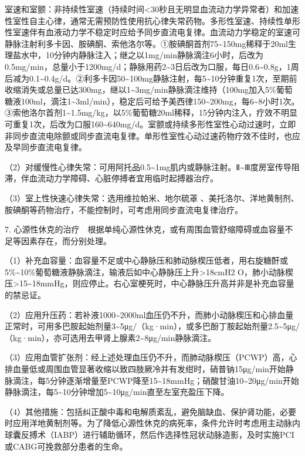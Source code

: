 室速和室颤：非持续性室速（持续时间\textless{}30秒且无明显血流动力学异常者）和加速性室性自主心律，通常无需预防性使用抗心律失常药物。多形性室速、持续性单形性室速伴有血液动力学不稳定时应给予同步直流电复律。血流动力学稳定的室速可静脉注射利多卡因、胺碘酮、索他洛尔等。①胺碘酮首剂75\textasciitilde{}150mg稀释于20ml生理盐水中，10分钟内静脉注入；继之以1mg/min静脉滴注6小时，后改为0.5mg/min，总量小于1200mg/d；静脉用药2\textasciitilde{}3日后改为口服，每日0.6\textasciitilde{}0.8g，1周后减为0.1\textasciitilde{}0.4g/d。②利多卡因50\textasciitilde{}100mg静脉注射，每5\textasciitilde{}10分钟重复1次，至期前收缩消失或总量已达300mg，继以1\textasciitilde{}3mg/min静脉滴注维持（100mg加入5\%葡萄糖液100ml，滴注1\textasciitilde{}3ml/min），稳定后可给予美西律150\textasciitilde{}200mg，每6\textasciitilde{}8小时1次。③索他洛尔首剂1\textasciitilde{}1.5mg/kg，以5\%葡萄糖20ml稀释，15分钟内注入，疗效不明显可重复1次，后改为口服160\textasciitilde{}640mg/d。室颤或持续多形性室性心动过速时，立即非同步直流电除颤或同步直流电复律。单形性室性心动过速药物疗效不佳时，也应及早同步直流电复律。

（2）对缓慢性心律失常：可用阿托品0.5\textasciitilde{}1mg肌内或静脉注射。Ⅱ\textasciitilde{}Ⅲ度房室传导阻滞，伴血流动力学障碍、心脏停搏者宜用临时起搏器治疗。

（3）室上性快速心律失常：选用维拉帕米、地尔硫䓬
、美托洛尔、洋地黄制剂、胺碘酮等药物治疗，不能控制时，可考虑用同步直流电复律治疗。

7.
心源性休克的治疗　根据单纯心源性休克，或有周围血管舒缩障碍或血容量不足等因素存在，而分别处理。

（1）补充血容量：血容量不足或中心静脉压和肺动脉楔压低者，用右旋糖酐或5\%\textasciitilde{}10\%葡萄糖液静脉滴注，输液后如中心静脉压上升\textgreater{}18cmH{2}
O，肺小动脉楔压\textgreater{}15\textasciitilde{}18mmHg，则应停止。右心室梗死时，中心静脉压升高并非是补充血容量的禁忌证。

（2）应用升压药：若补液1000\textasciitilde{}2000ml血压仍不升，而肺小动脉楔压和心排血量正常时，可用多巴胺起始剂量3\textasciitilde{}5μg/（kg·min），或多巴酚丁胺起始剂量2.5\textasciitilde{}5μg/（kg·min），亦可选用去甲肾上腺素2\textasciitilde{}8μg/min静脉滴注。

（3）应用血管扩张剂：经上述处理血压仍不升，而肺动脉楔压（PCWP）高，心排血量低或周围血管显著收缩以致四肢厥冷并有发绀时，硝普钠15μg/min开始静脉滴注，每5分钟逐渐增量至PCWP降至15\textasciitilde{}18mmHg；硝酸甘油10\textasciitilde{}20μg/min开始静脉滴注，每5\textasciitilde{}10分钟增加5\textasciitilde{}10μg/min直至左室充盈压下降。

（4）其他措施：包括纠正酸中毒和电解质紊乱，避免脑缺血、保护肾功能，必要时应用洋地黄制剂等。为了降低心源性休克的病死率，条件允许时考虑用主动脉内球囊反搏术（IABP）进行辅助循环，然后作选择性冠状动脉造影，及时实施PCI或CABG可挽救部分患者的生命。


